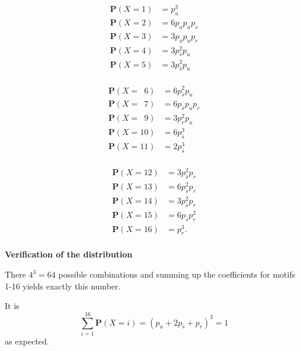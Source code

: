 \begin{minipage}{\linewidth}
  \begin{minipage}[c]{0.32\textwidth}
    \begin{align*}
      \mathbf{P}(X=1) &    =   p_u^3  \\
      \mathbf{P}(X=2) &    =   6 p_u p_u p_{\bar{s}}\\
      \mathbf{P}(X=3) &    =   3 p_u p_u p_r\\
      \mathbf{P}(X=4) &    =   3 p_{\bar{s}}^2 p_u\\
      \mathbf{P}(X=5) &    =   3 p_{\bar{s}}^2 p_u\\
    \end{align*}
  \end{minipage}%
  \begin{minipage}[c]{0.32\textwidth}
    \begin{align*}
      \mathbf{P}(X=\,\,\,6) &    =   6 p_{\bar{s}}^2 p_u\\
      \mathbf{P}(X=\,\,\,7) &    =   6 p_{\bar{s}} p_u p_r\\
      \mathbf{P}(X=\,\,\,9) &    =   3 p_r^2 p_u\\
      \mathbf{P}(X=10) &   =   6 p_{\bar{s}}^3   \\
      \mathbf{P}(X=11) &   =   2 p_{\bar{s}}^3    \\
    \end{align*}
  \end{minipage}%
  \begin{minipage}[c]{0.32\textwidth}
    \begin{align*}
      \mathbf{P}(X=12) &   =   3 p_{\bar{s}}^2 p_r\\
      \mathbf{P}(X=13) &   =   6 p_{\bar{s}}^2 p_r\\
      \mathbf{P}(X=14) &   =   3 p_{\bar{s}}^2 p_r\\
      \mathbf{P}(X=15) &   =   6 p_{\bar{s}} p_r^2\\
      \mathbf{P}(X=16) &   =   p_r^3.\\
    \end{align*}
  \end{minipage}  
\end{minipage}

\textbf{Verification of the distribution}

There $4^3 = 64$ possible combinations and summing up the coefficients
for motifs 1-16 yields exactly this number. 

It is
\[\sum_{i=1}^{16} \mathbf{P}(X=i) = (p_u+2p_{\bar{s}}+p_r)^3 = 1\]
as expected. %
